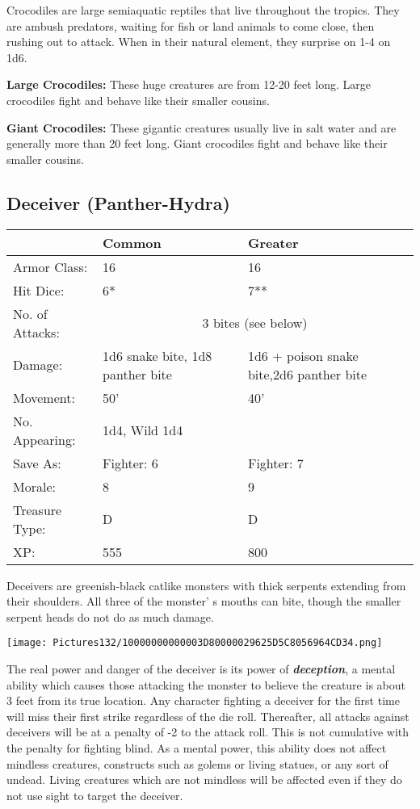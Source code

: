 \documentclass[a4paper,twoside,openany,10pt]{book}
\begin{document}
\begin{multicols}{2}
Crocodiles are large semiaquatic reptiles that live throughout the tropics. They are ambush predators, waiting for fish or land animals to come close, then rushing out to attack. When in their natural element, they surprise on 1-4 on 1d6.

\textbf{Large Crocodiles:} These huge creatures are from 12-20 feet long. Large crocodiles fight and behave like their smaller cousins.

\textbf{Giant Crocodiles:} These gigantic creatures usually live in salt water and are generally more than 20 feet long. Giant crocodiles fight and behave like their smaller cousins.

\subsection*{Deceiver (Panther-Hydra)}\label{deceiver-panther-hydra}

\begin{tabularx}{0.48\textwidth}{lXX}
& Common & Greater \\\hline
Armor Class: & 16 & 16 \\\hline
Hit Dice: & 6* & 7** \\\hline
No. of Attacks: &\multicolumn{2}{c}{3 bites (see below)} \\\hline
Damage: & 1d6 snake bite, 1d8 panther bite & 1d6 + poison snake bite,2d6 panther bite \\\hline
Movement: & 50' & 40' \\\hline
No. Appearing: & 1d4, Wild 1d4 & \\\hline
Save As: & Fighter: 6 & Fighter: 7 \\\hline
Morale: & 8 & 9 \\\hline
Treasure Type: & D & D \\\hline
XP: & 555 & 800 \\\hline
\end{tabularx}\medskip

Deceivers are greenish-black catlike monsters with thick serpents extending from their shoulders. All three of the monster' s mouths can bite, though the smaller serpent heads do not do as much damage.


\begin{center}
	\texttt{[image: Pictures132/10000000000003D80000029625D5C8056964CD34.png]}
\end{center}

The real power and danger of the deceiver is its power of \emph{\textbf{deception}}, a mental ability which causes those attacking the monster to believe the creature is about 3 feet from its true location. Any character fighting a deceiver for the first time will miss their first strike regardless of the die roll. Thereafter, all attacks against deceivers will be at a penalty of -2 to the attack roll. This is not cumulative with the penalty for fighting blind. As a mental power, this ability does not affect mindless creatures, constructs such as golems or living statues, or any sort of undead. Living creatures which are not mindless will be affected even if they do not use sight to target the deceiver.


\end{multicols}
\end{document}
